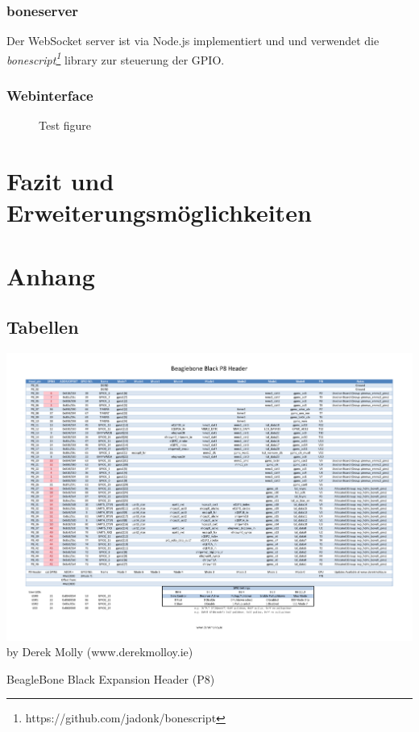 \documentclass[12pt, twoside, a4paper]{scrbook}
\begin{document}
\section{boneserver}
Der WebSocket server ist via Node.js implementiert und und verwendet die \textit{bonescript\footnote{https://github.com/jadonk/bonescript}} library zur steuerung der GPIO.

\section{Webinterface}

\begin{figure}
  \centering
  \caption{Test figure}
\end{figure}

\part[Fazit]{Fazit und Erweiterungsmöglichkeiten}

\appendix
\part{Anhang}

\chapter{Tabellen}

\begin{landscape}
  \begin{table}
  \centering
  \includegraphics[page=1, trim=14mm 19mm 14mm 19mm, clip=true, scale=0.8]{doc/BeagleboneBlackP8HeaderTable.pdf}\\
  \tiny by Derek Molly (www.derekmolloy.ie)
  \caption{BeagleBone Black Expansion Header (P8)}
  \end{table}
\end{landscape}
\end{document}
